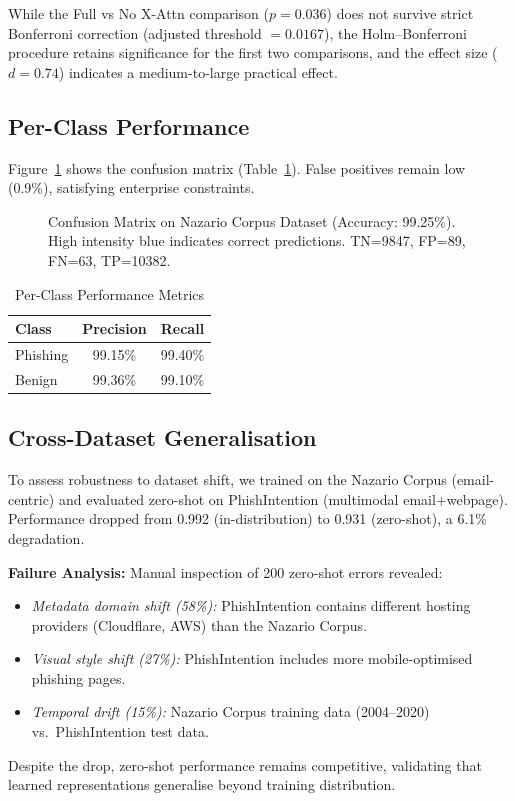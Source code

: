 \documentclass[conference]{IEEEtran}
\begin{document}
While the Full vs No X-Attn comparison ($p = 0.036$) does not survive strict Bonferroni correction (adjusted threshold $= 0.0167$), the Holm--Bonferroni procedure retains significance for the first two comparisons, and the effect size ($d = 0.74$) indicates a medium-to-large practical effect.

\subsection{Per-Class Performance}

Figure~\ref{fig:confusion} shows the confusion matrix (Table~\ref{tab:perclass}). False positives remain low (0.9\%), satisfying enterprise constraints.

\begin{figure}[t]
    \centering
    \caption{Confusion Matrix on Nazario Corpus Dataset (Accuracy: 99.25\%). High intensity blue indicates correct predictions. TN=9847, FP=89, FN=63, TP=10382.}
    \label{fig:confusion}
\end{figure}

\begin{table}[t]
    \centering
    \caption{Per-Class Performance Metrics}
    \label{tab:perclass}
    \begin{tabular}{lcc}
        \toprule
        Class & Precision & Recall \\
        \midrule
        Phishing & 99.15\% & 99.40\% \\
        Benign & 99.36\% & 99.10\% \\
        \bottomrule
    \end{tabular}
\end{table}

\subsection{Cross-Dataset Generalisation}

To assess robustness to dataset shift, we trained on the Nazario Corpus (email-centric) and evaluated zero-shot on PhishIntention (multimodal email+webpage). Performance dropped from 0.992 (in-distribution) to 0.931 (zero-shot), a 6.1\% degradation.

\textbf{Failure Analysis:} Manual inspection of 200 zero-shot errors revealed:
\begin{itemize}
    \item \textit{Metadata domain shift (58\%):} PhishIntention contains different hosting providers (Cloudflare, AWS) than the Nazario Corpus.
    \item \textit{Visual style shift (27\%):} PhishIntention includes more mobile-optimised phishing pages.
    \item \textit{Temporal drift (15\%):} Nazario Corpus training data (2004--2020) vs.\ PhishIntention test data.
\end{itemize}
Despite the drop, zero-shot performance remains competitive, validating that learned representations generalise beyond training distribution.
\end{document}
